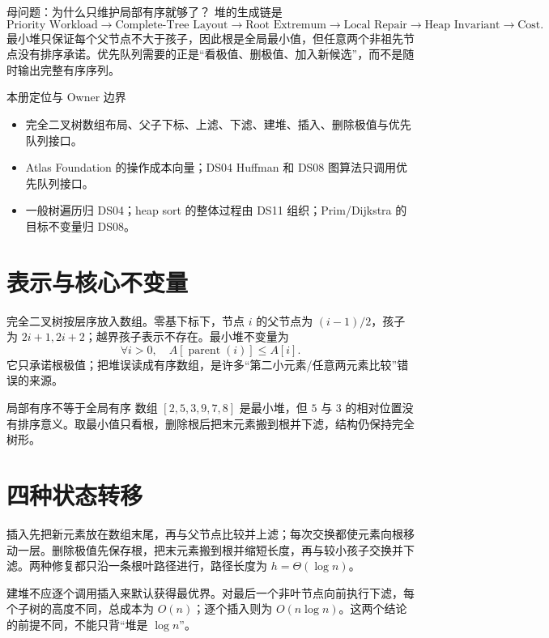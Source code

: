 \documentclass[UTF8,fontset=none,11pt,a4paper]{ctexart}
\begin{document}

\begin{corebox}{母问题：为什么只维护局部有序就够了？}
堆的生成链是
\[
\text{Priority Workload}\to\text{Complete-Tree Layout}\to\text{Root Extremum}\to\text{Local Repair}\to\text{Heap Invariant}\to\text{Cost}.
\]
最小堆只保证每个父节点不大于孩子，因此根是全局最小值，但任意两个非祖先节点没有排序承诺。优先队列需要的正是“看极值、删极值、加入新候选”，而不是随时输出完整有序序列。
\end{corebox}
\begin{methodbox}{本册定位与 Owner 边界}
\begin{itemize}
\item {}完全二叉树数组布局、父子下标、上滤、下滤、建堆、插入、删除极值与优先队列接口。
\item {}Atlas Foundation 的操作成本向量；DS04 Huffman 和 DS08 图算法只调用优先队列接口。
\item {}一般树遍历归 DS04；heap sort 的整体过程由 DS11 组织；Prim/Dijkstra 的目标不变量归 DS08。
\end{itemize}
\end{methodbox}
\tableofcontents\newpage

\section{表示与核心不变量}
完全二叉树按层序放入数组。零基下标下，节点 $i$ 的父节点为 $(i-1)/2$，孩子为 $2i+1,2i+2$；越界孩子表示不存在。最小堆不变量为
\[
\forall i>0,\quad A[\operatorname{parent}(i)]\le A[i].
\]
它只承诺根极值；把堆误读成有序数组，是许多“第二小元素/任意两元素比较”错误的来源。
\begin{examplebox}{局部有序不等于全局有序}
数组 $[2,5,3,9,7,8]$ 是最小堆，但 $5$ 与 $3$ 的相对位置没有排序意义。取最小值只看根，删除根后把末元素搬到根并下滤，结构仍保持完全树形。
\end{examplebox}

\section{四种状态转移}
插入先把新元素放在数组末尾，再与父节点比较并上滤；每次交换都使元素向根移动一层。删除极值先保存根，把末元素搬到根并缩短长度，再与较小孩子交换并下滤。两种修复都只沿一条根叶路径进行，路径长度为 $h=\Theta(\log n)$。

建堆不应逐个调用插入来默认获得最优界。对最后一个非叶节点向前执行下滤，每个子树的高度不同，总成本为 $O(n)$；逐个插入则为 $O(n\log n)$。这两个结论的前提不同，不能只背“堆是 $\log n$”。
\end{document}
